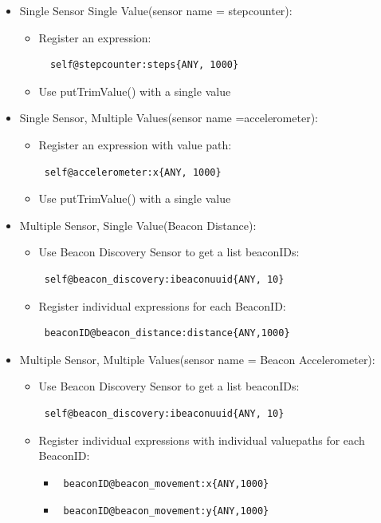 \begin{itemize}
  \item Single Sensor Single Value(sensor name = stepcounter):
  \begin{itemize}
    \item Register an expression: \begin{verbatim}  self@stepcounter:steps{ANY, 1000}\end{verbatim} 
    \item Use putTrimValue() with a single value
  \end{itemize}
 
  \item  Single Sensor, Multiple Values(sensor name =accelerometer):
  \begin{itemize}
    \item Register an expression with value path: \begin{verbatim} self@accelerometer:x{ANY, 1000}\end{verbatim}
    \item Use putTrimValue() with a single value
  \end{itemize}

  \item Multiple Sensor, Single Value(Beacon Distance):
  \begin{itemize}
    \item Use Beacon Discovery Sensor to get a list beaconIDs: \begin{verbatim} self@beacon_discovery:ibeaconuuid{ANY, 10}\end{verbatim}
    \item Register individual expressions for each BeaconID: \begin{verbatim} beaconID@beacon_distance:distance{ANY,1000} \end{verbatim}
  \end{itemize}

  \item  Multiple Sensor, Multiple Values(sensor name = Beacon Accelerometer):
  \begin{itemize}
    \item Use Beacon Discovery Sensor to get a list beaconIDs: \begin{verbatim} self@beacon_discovery:ibeaconuuid{ANY, 10}\end{verbatim}
    \item Register individual expressions with individual valuepaths for each BeaconID: 
    \begin{itemize}
     \item \begin{verbatim} beaconID@beacon_movement:x{ANY,1000} \end{verbatim}
     \item \begin{verbatim} beaconID@beacon_movement:y{ANY,1000} \end{verbatim}
    \end{itemize}

 \end{itemize}


\end{itemize}

